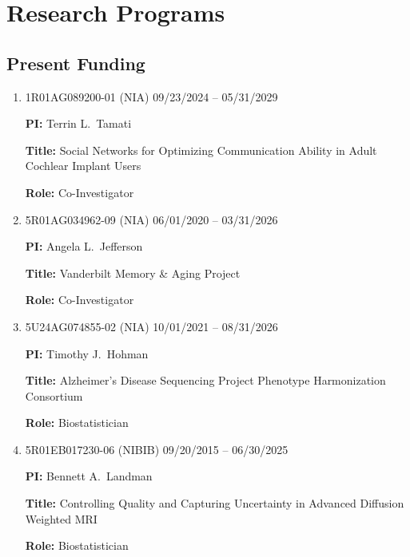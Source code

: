 \documentclass[12pt]{article}
\begin{document}
	
	\section*{Research Programs}
	\subsection*{Present Funding}
	\begin{enumerate}
		\item 1R01AG089200-01 (NIA) \hfill 09/23/2024 -- 
		05/31/2029
		
		{\bf PI:} Terrin L.\ Tamati 
		
		{\bf Title:} Social Networks for Optimizing Communication 
		Ability in Adult Cochlear Implant Users
		
		{\bf Role:} Co-Investigator
		
		\item 5R01AG034962-09 (NIA) \hfill 06/01/2020 -- 03/31/2026
		
		{\bf PI:} Angela L.\ Jefferson
		
		{\bf Title:} Vanderbilt Memory \& Aging Project
		
		{\bf Role:} Co-Investigator
		
		\item 5U24AG074855-02 (NIA) \hfill 10/01/2021 -- 08/31/2026
		
		{\bf PI:} Timothy J.\ Hohman
		
		{\bf Title:} Alzheimer's Disease Sequencing Project Phenotype Harmonization Consortium
		
		{\bf Role:} Biostatistician
		
		\item 5R01EB017230-06 (NIBIB) \hfill 09/20/2015 -- 06/30/2025
		
		{\bf PI:} Bennett A.\ Landman
		
		{\bf Title:} Controlling Quality and Capturing Uncertainty 
		in Advanced Diffusion Weighted MRI
		
		{\bf Role:} Biostatistician
	\end{enumerate}
	
\end{document}
